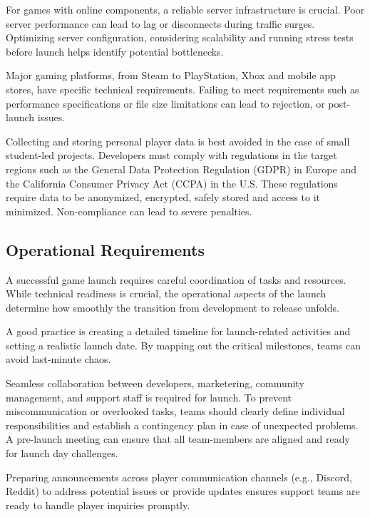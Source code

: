 For games with online components, a reliable server infrastructure is crucial. Poor server performance can lead to lag or disconnects during traffic surges. Optimizing server configuration, considering scalability and running stress tests before launch helps identify potential bottlenecks.

Major gaming platforms, from Steam to PlayStation, Xbox and mobile app stores, have specific technical requirements. Failing to meet requirements such as performance specifications or file size limitations can lead to rejection, or post-launch issues.

Collecting and storing personal player data is best avoided in the case of small student-led projects. Developers must comply with regulations in the target regions such as the General Data Protection Regulation (GDPR) in Europe and the California Consumer Privacy Act (CCPA) in the U.S. These regulations require data to be anonymized, encrypted, safely stored and access to it minimized. Non-compliance can lead to severe penalties.

\subsection{Operational Requirements}
A successful game launch requires careful coordination of tasks and resources. While technical readiness is crucial, the operational aspects of the launch determine how smoothly the transition from development to release unfolds.

A good practice is creating a detailed timeline for launch-related activities and setting a realistic launch date. By mapping out the critical milestones, teams can avoid last-minute chaos.

Seamless collaboration between developers, marketering, community management, and support staff is required for launch. To prevent miscommunication or overlooked tasks, teams should clearly define individual responsibilities and establish a contingency plan in case of unexpected problems. A pre-launch meeting can ensure that all team-members are aligned and ready for launch day challenges.

Preparing announcements across player communication channels (e.g., Discord, Reddit) to address potential issues or provide updates ensures support teams are ready to handle player inquiries promptly.

